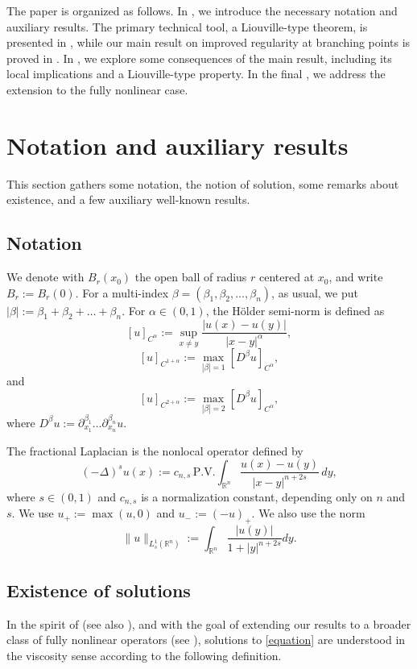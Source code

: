 \documentclass[11pt,reqno]{amsart}
\numberwithin{equation}{section}
\numberwithin{theorem}{section}
\numberwithin{lemma}{section}
\numberwithin{corollary}{section}
\numberwithin{remark}{section}
\numberwithin{proposition}{section}
\numberwithin{definition}{section}
\newcommand{\R}{\mathbb{R}}
\begin{document}
The paper is organized as follows. In , we introduce the necessary notation and auxiliary results. The primary technical tool, a Liouville-type theorem, is presented in , while our main result on improved regularity at branching points is proved in . In , we explore some consequences of the main result, including its local implications and a Liouville-type property. In the final , we address the extension to the fully nonlinear case.

\medskip

\section{Notation and auxiliary results}\label{s2}

This section gathers some notation, the notion of solution, some remarks about existence, and a few auxiliary well-known results.

\subsection{Notation}
We denote with $B_r(x_0)$ the open ball of radius $r$ centered at $x_0$, and write $B_r:=B_r(0)$. For a multi-index $\beta=(\beta_1,\beta_2,\ldots,\beta_n)$, as usual, we put $|\beta|:=\beta_1+\beta_2+\ldots+\beta_n$. For $\alpha\in(0,1)$, the H\"older semi-norm is defined as 
$$
[u]_{C^{\alpha}}:=\sup_{x\neq y}\frac{|u(x)-u(y)|}{|x-y|^\alpha},
$$
$$
[u]_{C^{1+\alpha}}:=\max_{|\beta|=1} \left[ D^\beta u \right]_{C^{\alpha}},
$$
and
$$
[u]_{C^{2+\alpha}}:=\max_{|\beta|=2} \left[ D^\beta u \right]_{C^{\alpha}},
$$
where $D^\beta u:=\partial_{x_1}^{\beta_1}\ldots\partial_{x_n}^{\beta_n}u$.

The fractional Laplacian is the nonlocal operator defined by
\begin{equation*}	
(-\Delta)^su(x):=c_{n,s}\,\textrm{P.V.}\int_{\R^n}\frac{u(x)-u(y)}{|x-y|^{n+2s}}\,dy,
\end{equation*}
where $s \in (0,1)$ and $c_{n,s}$ is a normalization constant, depending only on $n$ and $s$. We use $u_+:=\max(u,0)$ and $u_-:=(-u)_+$. We also use the norm
$$
\|u\|_{L^1_s(\R^n)}:=\int_{\R^n}\frac{|u(y)|}{1+|y|^{n+2s}}dy.
$$

\subsection{Existence of solutions}

In the spirit of \cite{BCI08, BI08} (see also \cite{CLU14, CS09, CTU20}), and with the goal of extending our results to a broader class of fully nonlinear operators (see ), solutions to \eqref{equation} are understood in the viscosity sense according to the following definition. 
\end{document}
